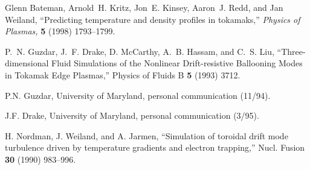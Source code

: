 
\begin{thebibliography}{99}

Glenn Bateman, Arnold~H. Kritz, Jon~E. Kinsey, Aaron~J. Redd, and Jan Weiland,
``Predicting temperature and density profiles in tokamaks,''
{\em Physics of Plasmas,} {\bf 5} (1998) 1793--1799.

P.~N. Guzdar, J.~F. Drake, D. McCarthy, A.~B. Hassam, and C.~S. Liu,
``Three-dimensional Fluid Simulations of the Nonlinear Drift-resistive
Ballooning Modes in Tokamak Edge Plasmas,'' Physics of Fluids B {\bf 5}
(1993) 3712.

 P.N. Guzdar, University of Maryland, personal communication
 (11/94).


 J.F. Drake, University of Maryland, personal
communication (3/95).


 H. Nordman, J. Weiland, and A. Jarmen, 
``Simulation of toroidal drift mode turbulence driven by 
temperature gradients and electron trapping,'' 
Nucl. Fusion {\bf 30} (1990) 983--996.


\end{thebibliography}


